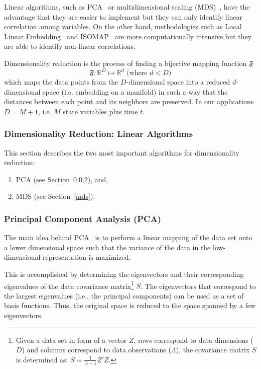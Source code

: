 Linear algorithms, such as PCA~\cite{JolliffePCA} or multidimensional scaling (MDS)~\cite{MDS}, have the advantage that they are easier to implement but they can only identify linear correlation among variables. On the other hand, methodologies such as Local Linear Embedding~\cite{lle} and ISOMAP~\cite{isomap} are more computationally intensive but they are able to identify non-linear correlations.

Dimensionality reduction is the process of finding a bijective mapping function $\mathfrak{F}$
\begin{equation}\label{eq:dimRed}
    \mathfrak{F}:\mathbb{R}^{D}\mapsto\mathbb{R}^{d} \mbox{ (where $d<D$)}
\end{equation}
which maps the data points from the $D$-dimensional space into a reduced $d$-dimensional space (i.e. embedding on a manifold) in such a way that the distances between each point and its neighbors are preserved. In our applications $D = M+1$, i.e. $M$ state variables plus time $t$.


\subsubsection{Dimensionality Reduction: Linear Algorithms}
\label{dimRed}
This section describes the two most important algorithms for dimensionality reduction:
\begin{enumerate}
  \item PCA (see Section~\ref{pca}), and,
  \item MDS (see Section~\ref{mds}).
\end{enumerate}
	
\subsubsection{Principal Component Analysis (PCA)}
\label{pca}

The main idea behind PCA~\cite{JolliffePCA} is to perform a linear mapping of the data set onto a lower dimensional space such that the variance of the data in the low-dimensional representation is maximized.

This is accomplished by determining the eigenvectors and their corresponding eigenvalues of the data covariance matrix\footnote{Given a data set in form of a vector $Z$, rows correspond to data dimensions ($D$) and columns correspond to data observations ($\Lambda$), the covariance matrix $S$ is determined as: $S=\frac{1}{\Lambda-1}Z'Z$.}
$S$.
The eigenvectors that correspond to the largest eigenvalues (i.e., the principal components) can be used as a set of basis functions. Thus, the original space is reduced to the space spanned by a few eigenvectors.


